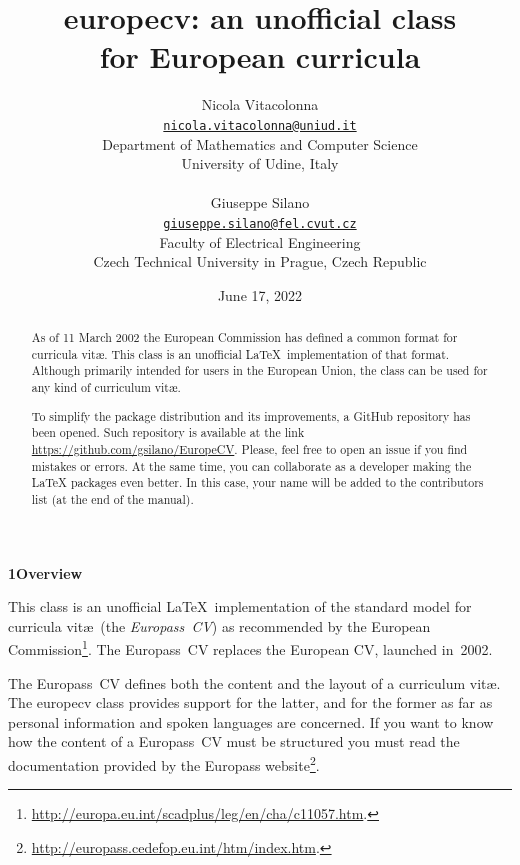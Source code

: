 \documentclass{europecv}
\title{\textsf{europecv}: an unofficial class\\
	for European curricula}
\author{Nicola Vitacolonna\\
	\href{mailto:nicola.vitacolonna@uniud.it}{\texttt{nicola.vitacolonna@uniud.it}}\\
	Department of Mathematics and Computer Science\\
	University of Udine, Italy\\
	\\
	Giuseppe Silano\\
	\href{mailto:giuseppe.silano@fel.cvut.cz}{\texttt{giuseppe.silano@fel.cvut.cz}}\\
    Faculty of Electrical Engineering\\
    Czech Technical University in Prague, Czech Republic\\
}
\date{June 17, 2022}
\begin{document}

\maketitle

\pagestyle{plain}


\label{ABSTRACT}
\begin{abstract}

As of 11 March 2002 the European Commission has defined a common format for curricula vit\ae. This class is an unofficial \LaTeX\ implementation of that format. Although primarily intended for users in the European Union, the class can be used for any kind of curriculum vit\ae.

To simplify the package distribution and its improvements, a GitHub repository has been opened.
Such repository is available at the link \url{https://github.com/gsilano/EuropeCV}. Please, feel
free to open an issue if you find mistakes or errors. At the same time, you can collaborate as a
developer making the LaTeX packages even better. In this case, your name will be added to the
contributors list (at the end of the manual).

\end{abstract}



\label{Overview}
\vspace{0.25cm}
\textbf{\large{1\hspace{0.5cm}Overview}}
\vspace{0.25cm}

This class is an unofficial \LaTeX\ implementation of the standard model for curricula vit\ae\ (the
\emph{Europass~CV\/}) as recommended by the European
Commission\footnote{\url{http://europa.eu.int/scadplus/leg/en/cha/c11057.htm}.}. The Europass~CV
replaces the European CV, launched in~2002.

The Europass~CV defines both the content and the layout of a curriculum vit\ae. The
\textsf{europecv} class provides support for the latter, and for the former as far as personal
information and spoken languages are concerned. If you want to know how the content of a
Europass~CV must be structured you must read the documentation provided by the Europass
website\footnote{\url{http://europass.cedefop.eu.int/htm/index.htm}.}.
\end{document}
